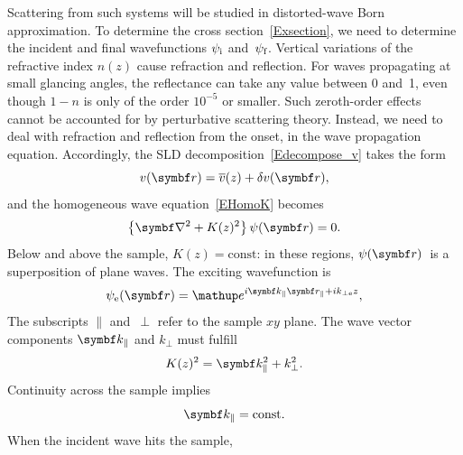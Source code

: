 Scattering from such systems will be studied in distorted-wave Born approximation.
To determine the cross section~\cref{Exsection},
we need to determine the incident and final wavefunctions
$\psi_\si$ and~$\psi_\sf$.
Vertical variations of the refractive index $n(z)$
%
cause refraction and reflection.
%
%
%
For waves propagating at small glancing angles,
the reflectance can take any value between 0 and~1,
even though $1-n$ is only of the order $10^{-5}$ or smaller.
Such zeroth-order effects cannot be accounted for
by perturbative scattering theory.
Instead, we need to deal with refraction and reflection
from the onset, in the wave propagation equation.
Accordingly, the SLD decomposition~\cref{Edecompose_v} takes the form
\begin{equation}\label{Edecompose_vz}
  v(\r) = \mv(z) + \delta v(\r),
\end{equation}
and the homogeneous wave equation~\cref{EHomoK} becomes
\begin{equation}\label{EWaveZ}
  \left\{\Nabla^2+K(z)^2\right\}\psi(\r) = 0.
\end{equation}
Below and above the sample,
$K(z)=\text{const}$:
in these regions, $\psi(\r)$~is a superposition of plane waves.
The exciting wavefunction is
%
%
\begin{equation}\label{Epsiminus}
  \psi_\se(\r) = \e^{i\k_\parallel\r_\parallel+ik_{\perp\se}z},
\end{equation}
%
%
%
%
The subscripts $\parallel$ and~$\perp$ refer to the sample $xy$ plane.
The wave vector components $\k_\parallel$ and $k_{\perp}$ must fulfill
\begin{equation}
  K(z)^2=\k_\parallel^2+k_{\perp}^2.
\end{equation}
%
%
Continuity across the sample implies
\begin{equation}\label{Ekconst}
  \k_\parallel = \text{const}.
\end{equation}
%
%
When the incident wave hits the sample,
